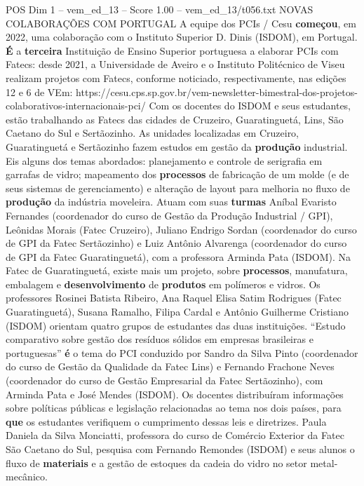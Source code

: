\begin{textsample}{POS Dim 1 – vem\_ed\_13 – Score 1.00 – vem\_ed\_13/t056.txt}  \label{ex:f1_pos_126}
NOVAS COLABORAÇÕES COM PORTUGAL A equipe dos PCIs / Cesu \textbf{começou}, em 2022, uma colaboração com o Instituto Superior D.
Dinis (ISDOM), em Portugal. \textbf{É} a \textbf{terceira} Instituição de Ensino Superior portuguesa a elaborar PCIs com Fatecs: desde 2021, a Universidade de Aveiro e o Instituto Politécnico de Viseu realizam projetos com Fatecs, conforme noticiado, respectivamente, nas edições 12 e 6 de VEm: https://cesu.cps.sp.gov.br/vem-newsletter-bimestral-dos-projetos-colaborativos-internacionais-pci/ Com os docentes do ISDOM e seus estudantes, estão trabalhando as Fatecs das cidades de Cruzeiro, Guaratinguetá, Lins, São Caetano do Sul e Sertãozinho.
As unidades localizadas em Cruzeiro, Guaratinguetá e Sertãozinho fazem estudos em gestão da \textbf{produção} industrial.
Eis alguns dos temas abordados: planejamento e controle de serigrafia em garrafas de vidro; mapeamento dos \textbf{processos} de fabricação de um molde (e de seus sistemas de gerenciamento) e alteração de layout para melhoria no fluxo de \textbf{produção} da indústria moveleira.
Atuam com suas \textbf{turmas} Aníbal Evaristo Fernandes (coordenador do curso de Gestão da Produção Industrial / GPI), Leônidas Morais (Fatec Cruzeiro), Juliano Endrigo Sordan (coordenador do curso de GPI da Fatec Sertãozinho) e Luiz Antônio Alvarenga (coordenador do curso de GPI da Fatec Guaratinguetá), com a professora Arminda Pata (ISDOM).
Na Fatec de Guaratinguetá, existe mais um projeto, sobre \textbf{processos}, manufatura, embalagem e \textbf{desenvolvimento} de \textbf{produtos} em polímeros e vidros.
Os professores Rosinei Batista Ribeiro, Ana Raquel Elisa Satim Rodrigues (Fatec Guaratinguetá), Susana Ramalho, Filipa Cardal e Antônio Guilherme Cristiano (ISDOM) orientam quatro grupos de estudantes das duas instituições. “Estudo comparativo sobre gestão dos resíduos sólidos em empresas brasileiras e portuguesas” \textbf{é} o tema do PCI conduzido por Sandro da Silva Pinto (coordenador do curso de Gestão da Qualidade da Fatec Lins) e Fernando Frachone Neves (coordenador do curso de Gestão Empresarial da Fatec Sertãozinho), com Arminda Pata e José Mendes (ISDOM).
Os docentes distribuíram informações sobre políticas públicas e legislação relacionadas ao tema nos dois países, para \textbf{que} os estudantes verifiquem o cumprimento dessas leis e diretrizes.
Paula Daniela da Silva Monciatti, professora do curso de Comércio Exterior da Fatec São Caetano do Sul, pesquisa com Fernando Remondes (ISDOM) e seus alunos o fluxo de \textbf{materiais} e a gestão de estoques da cadeia do vidro no setor metal-mecânico.

\end{textsample}
